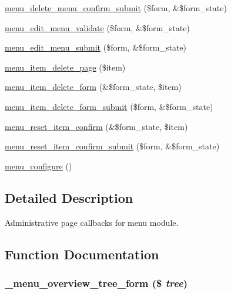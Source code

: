 \begin{CompactItemize}
\item 
\hyperlink{menu_8admin_8inc_072747a64b798d6967fbf81e046a5475}{menu\_\-delete\_\-menu\_\-confirm\_\-submit} (\$form, \&\$form\_\-state)
\item 
\hyperlink{menu_8admin_8inc_ec2a99bf39c5c18e9c1f1980a27baad7}{menu\_\-edit\_\-menu\_\-validate} (\$form, \&\$form\_\-state)
\item 
\hyperlink{menu_8admin_8inc_71326ad2f1a2c791cc3e6081a9d28d26}{menu\_\-edit\_\-menu\_\-submit} (\$form, \&\$form\_\-state)
\item 
\hyperlink{menu_8admin_8inc_2aaea348b520cd9c44792983f1749cfa}{menu\_\-item\_\-delete\_\-page} (\$item)
\item 
\hyperlink{menu_8admin_8inc_d71465464dc932b36ed1cb8a0d59cf73}{menu\_\-item\_\-delete\_\-form} (\&\$form\_\-state, \$item)
\item 
\hyperlink{menu_8admin_8inc_68d6f7a22501af5a1e4864996008c0b7}{menu\_\-item\_\-delete\_\-form\_\-submit} (\$form, \&\$form\_\-state)
\item 
\hyperlink{menu_8admin_8inc_c58d4364d0480d2fdfd2550ac10bfae0}{menu\_\-reset\_\-item\_\-confirm} (\&\$form\_\-state, \$item)
\item 
\hyperlink{menu_8admin_8inc_84c625e0f863a78cf6c68f16e136422f}{menu\_\-reset\_\-item\_\-confirm\_\-submit} (\$form, \&\$form\_\-state)
\item 
\hyperlink{menu_8admin_8inc_06edf99d84102336d33cb6fd3201d1ca}{menu\_\-configure} ()
\end{CompactItemize}


\subsection{Detailed Description}
Administrative page callbacks for menu module. 

\subsection{Function Documentation}
\hypertarget{menu_8admin_8inc_15e0c24820f3445628b676e212e5fbcc}{
\subsubsection[{\_\-menu\_\-overview\_\-tree\_\-form}]{\setlength{\rightskip}{0pt plus 5cm}\_\-menu\_\-overview\_\-tree\_\-form (\$ {\em tree})}}
\label{menu_8admin_8inc_15e0c24820f3445628b676e212e5fbcc}



